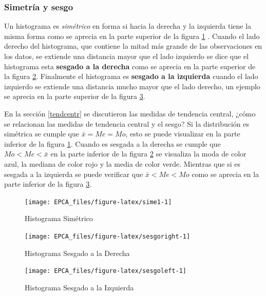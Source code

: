 \documentclass[letterpaper,]{book}
\begin{document}
\hypertarget{simetria-y-sesgo}{%
\subsubsection{Simetría y sesgo}\label{simetria-y-sesgo}}

Un histograma es \emph{simétrico} en forma si hacia la derecha y la izquierda tiene la misma forma como se aprecia en la parte superior de la figura \ref{fig:sime1} \citep{lind2019}. Cuando el lado derecho del histograma, que contiene la mitad más grande de las observaciones en los datos, se extiende una distancia mayor que el lado izquierdo se dice que el histograma esta \textbf{sesgado a la derecha} \citep{envoy2018} como se aprecia en la parte superior de la figura \ref{fig:sesgoright}. Finalmente el histograma es \textbf{sesgado a la izquierda} cuando el lado izquierdo se extiende una distancia mucho mayor que el lado derecho, un ejemplo se aprecia en la parte superior de la figura \ref{fig:sesgoleft}.

En la sección \ref{tendcentr} se discutieron las medidas de tendencia central, ¿cómo se relacionan las medidas de tendencia central y el sesgo? Si la distribución es simétrica se cumple que \(\bar{x}=Me=Mo\), esto se puede visualizar en la parte inferior de la figura \ref{fig:sime1}. Cuando es sesgada a la derecha se cumple que \(Mo < Me < \bar{x}\) en la parte inferior de la figura \ref{fig:sesgoright} se visualiza la moda de color azul, la mediana de color rojo y la media de color verde. Mientras que si es sesgada a la izquierda se puede verificar que \(\bar{x} < Me < Mo\) como se aprecia en la parte inferior de la figura \ref{fig:sesgoleft}.

\begin{figure}[h!]

{\centering \texttt{[image: EPCA\_files/figure-latex/sime1-1]} 

}

\caption{Histograma Simétrico}\label{fig:sime1}
\end{figure}

\begin{figure}[h!]

{\centering \texttt{[image: EPCA\_files/figure-latex/sesgoright-1]} 

}

\caption{Histograma Sesgado a la Derecha}\label{fig:sesgoright}
\end{figure}

\begin{figure}[h!]

{\centering \texttt{[image: EPCA\_files/figure-latex/sesgoleft-1]} 

}

\caption{Histograma Sesgado a la Izquierda}\label{fig:sesgoleft}
\end{figure}
\end{document}
